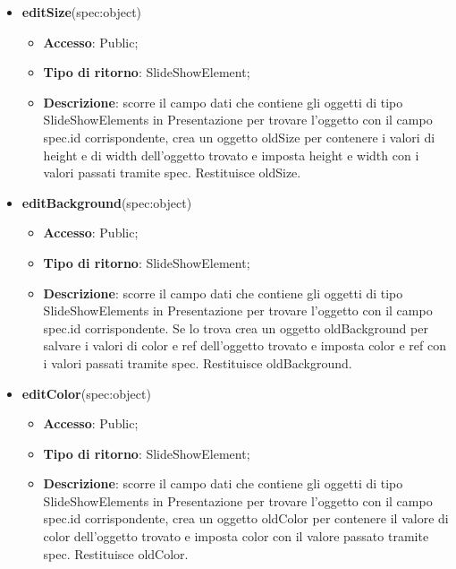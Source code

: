 {\begin{itemize}
\begin{itemize}
				\item \textbf{Accesso}: Public;
				\item \textbf{Tipo di ritorno}: SlideShowElement;
				\item \textbf{Descrizione}: scorre il campo dati che contiene gli oggetti di tipo SlideShowElements in Presentazione per trovare l’oggetto con il campo spec.id corrispondente, crea un oggetto oldRotation per contenere il valore di rotation dell’oggetto trovato e imposta rotation con il valore passato tramite spec. Restituisce oldRotation.
			\end{itemize}
			\item \textbf{editSize}(spec:object)
			\begin{itemize}
				\item \textbf{Accesso}: Public;
				\item \textbf{Tipo di ritorno}: SlideShowElement;
				\item \textbf{Descrizione}: scorre il campo dati che contiene gli oggetti di tipo SlideShowElements in Presentazione per trovare l’oggetto con il campo spec.id corrispondente, crea un oggetto oldSize per contenere i valori di height e di width dell’oggetto trovato e imposta height e width con i valori passati tramite spec. Restituisce oldSize.
			\end{itemize}
			\item \textbf{editBackground}(spec:object)
			\begin{itemize}
				\item \textbf{Accesso}: Public;
				\item \textbf{Tipo di ritorno}: SlideShowElement;
				\item \textbf{Descrizione}: scorre il campo dati che contiene gli oggetti di tipo SlideShowElements in Presentazione per trovare l’oggetto con il campo spec.id corrispondente. Se lo trova crea un oggetto oldBackground per salvare i valori di color e ref dell’oggetto trovato e imposta color e ref con i valori passati tramite spec. Restituisce oldBackground.
			\end{itemize}
			\item \textbf{editColor}(spec:object)
			\begin{itemize}
				\item \textbf{Accesso}: Public;
				\item \textbf{Tipo di ritorno}: SlideShowElement;
				\item \textbf{Descrizione}: scorre il campo dati che contiene gli oggetti di tipo SlideShowElements in Presentazione per trovare l’oggetto con il campo spec.id corrispondente, crea un oggetto oldColor per contenere il valore di color dell’oggetto trovato e imposta color con il valore passato tramite spec. Restituisce oldColor.

\end{itemize}
\end{itemize}}
